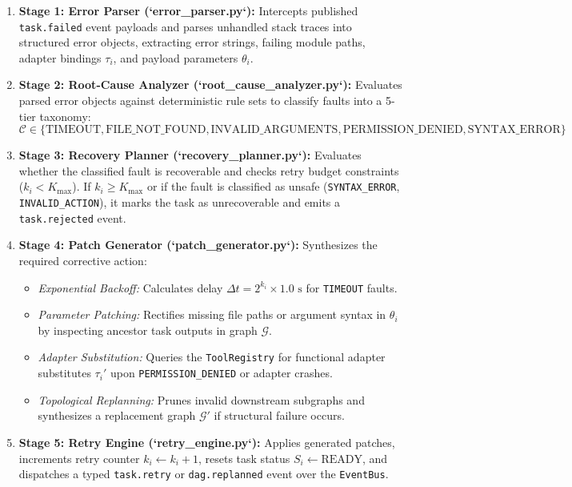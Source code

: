 \documentclass[conference]{IEEEtran}
\begin{document}
\begin{enumerate}
    \item \textbf{Stage 1: Error Parser (`error\_parser.py`):} Intercepts published \texttt{task.failed} event payloads and parses unhandled stack traces into structured error objects, extracting error strings, failing module paths, adapter bindings $\tau_i$, and payload parameters $\theta_i$.
    \item \textbf{Stage 2: Root-Cause Analyzer (`root\_cause\_analyzer.py`):} Evaluates parsed error objects against deterministic rule sets to classify faults into a 5-tier taxonomy:
    \begin{equation}
    \mathcal{C} \in \{\text{TIMEOUT}, \text{FILE\_NOT\_FOUND}, \text{INVALID\_ARGUMENTS}, \text{PERMISSION\_DENIED}, \text{SYNTAX\_ERROR}\}
    \end{equation}
    \item \textbf{Stage 3: Recovery Planner (`recovery\_planner.py`):} Evaluates whether the classified fault is recoverable and checks retry budget constraints ($k_i < K_{\text{max}}$). If $k_i \ge K_{\text{max}}$ or if the fault is classified as unsafe (\texttt{SYNTAX\_ERROR}, \texttt{INVALID\_ACTION}), it marks the task as unrecoverable and emits a \texttt{task.rejected} event.
    \item \textbf{Stage 4: Patch Generator (`patch\_generator.py`):} Synthesizes the required corrective action:
    \begin{itemize}
        \item \textit{Exponential Backoff:} Calculates delay $\Delta t = 2^{k_i} \times 1.0\text{ s}$ for \texttt{TIMEOUT} faults.
        \item \textit{Parameter Patching:} Rectifies missing file paths or argument syntax in $\theta_i$ by inspecting ancestor task outputs in graph $\mathcal{G}$.
        \item \textit{Adapter Substitution:} Queries the \texttt{ToolRegistry} for functional adapter substitutes $\tau_i'$ upon \texttt{PERMISSION\_DENIED} or adapter crashes.
        \item \textit{Topological Replanning:} Prunes invalid downstream subgraphs and synthesizes a replacement graph $\mathcal{G}'$ if structural failure occurs.
    \end{itemize}
    \item \textbf{Stage 5: Retry Engine (`retry\_engine.py`):} Applies generated patches, increments retry counter $k_i \leftarrow k_i + 1$, resets task status $S_i \leftarrow \text{READY}$, and dispatches a typed \texttt{task.retry} or \texttt{dag.replanned} event over the \texttt{EventBus}.
\end{enumerate}
\end{document}
